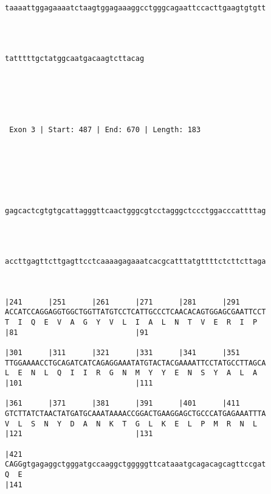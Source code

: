 \documentclass{article}
\begin{document}
\begin{Verbatim}
                                                            
taaaattggagaaaatctaagtggagaaaggcctgggcagaattccacttgaagtgtgtt
                                                            
                                                            
   
                                
tatttttgctatggcaatgacaagtcttacag
                                
                                
  



 Exon 3 | Start: 487 | End: 670 | Length: 183 





   
                                                            
gagcactcgtgtgcattagggttcaactgggcgtcctagggctccctggacccattttag
                                                            
                                                            
   
                                                            
accttgagttcttgagttcctcaaaagagaaatcacgcatttatgttttctcttcttaga
                                                            
                                                            
   
|241      |251      |261      |271      |281      |291      
ACCATCCAGGAGGTGGCTGGTTATGTCCTCATTGCCCTCAACACAGTGGAGCGAATTCCT
T  I  Q  E  V  A  G  Y  V  L  I  A  L  N  T  V  E  R  I  P  
|81                           |91                           
   
|301      |311      |321      |331      |341      |351      
TTGGAAAACCTGCAGATCATCAGAGGAAATATGTACTACGAAAATTCCTATGCCTTAGCA
L  E  N  L  Q  I  I  R  G  N  M  Y  Y  E  N  S  Y  A  L  A  
|101                          |111                          
   
|361      |371      |381      |391      |401      |411      
GTCTTATCTAACTATGATGCAAATAAAACCGGACTGAAGGAGCTGCCCATGAGAAATTTA
V  L  S  N  Y  D  A  N  K  T  G  L  K  E  L  P  M  R  N  L  
|121                          |131                          
   
|421                                                        
CAGGgtgagaggctgggatgccaaggctgggggttcataaatgcagacagcagttccgat
Q  E                                                        
|141                                                        
   

\end{Verbatim}
\end{document}
